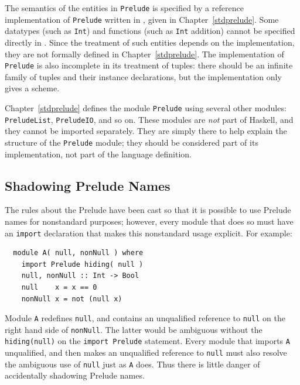 The semantics of the entities in \mbox{\tt Prelude} is specified by a reference
implementation of \mbox{\tt Prelude} written in \Haskell{}, given in
Chapter~\ref{stdprelude}.  Some datatypes (such as \mbox{\tt Int}) and
functions (such as \mbox{\tt Int} addition) cannot be specified directly in
\Haskell{}.  Since the treatment of such entities depends on the
implementation, they are not formally defined in Chapter~\ref{stdprelude}.
The implementation of
\mbox{\tt Prelude} is also incomplete in its treatment of tuples: there should
be an infinite family of tuples and their instance declarations, but the
implementation only gives a scheme.

Chapter~\ref{stdprelude} defines the module \mbox{\tt Prelude} using
several other modules: \mbox{\tt PreludeList}, \mbox{\tt PreludeIO}, and so on.
These modules are {\em not} part of Haskell, and they cannot be imported
separately.  They are simply 
there to help explain the structure of the \mbox{\tt Prelude} module; they
should be considered part of its implementation, not part of the language
definition.
 
\subsection{Shadowing Prelude Names}
\label{std-prel-shadowing}

The rules about the Prelude have been cast so that it is
possible to use Prelude names for nonstandard purposes; however,
every module that does so must have an \mbox{\tt import} declaration
that makes this nonstandard usage explicit.  For example:
\bprog
{\small\begin{verbatim}
  module A( null, nonNull ) where
    import Prelude hiding( null ) 
    null, nonNull :: Int -> Bool
    null    x = x == 0
    nonNull x = not (null x)
\end{verbatim}}
\eprog
Module \mbox{\tt A} redefines \mbox{\tt null}, and contains an unqualified reference to \mbox{\tt null}
on the right hand side of \mbox{\tt nonNull}. The latter would be ambiguous
without the \mbox{\tt hiding(null)} on the \mbox{\tt import\ Prelude} statement. Every
module that imports \mbox{\tt A} unqualified, and then makes an unqualified
reference to \mbox{\tt null} must also resolve the ambiguous use of \mbox{\tt null} just as
\mbox{\tt A} does. Thus there is little danger of accidentally shadowing Prelude
names.


